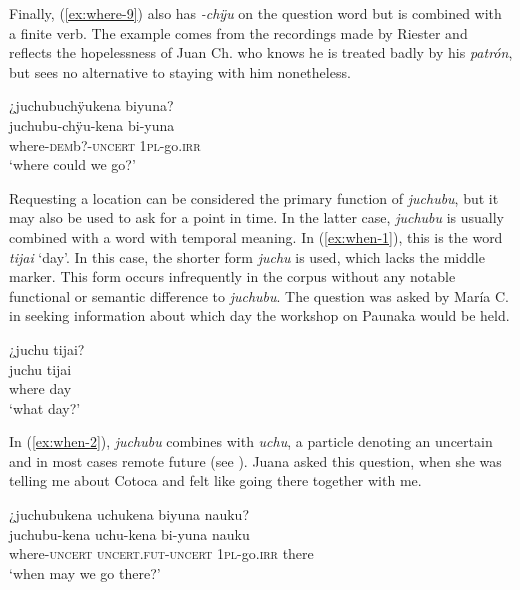 Finally, (\ref{ex:where-9}) also has \textit{-chÿu} on the question word but is combined with a finite verb. The example comes from the recordings made by Riester and reflects the hopelessness of Juan Ch. who knows he is treated badly by his \textit{patrón}, but sees no alternative to staying with him nonetheless.

\ea\label{ex:where-9}
\begingl
\glpreamble ¿juchubuchÿukena biyuna?\\
\gla juchubu-chÿu-kena bi-yuna\\
\glb where-\textsc{dem}b?-\textsc{uncert} 1\textsc{pl}-go.\textsc{irr}\\
\glft ‘where could we go?’
\endgl
\trailingcitation{[nxx-p630101g-1.176]}
\xe

Requesting a location can be considered the primary function of \textit{juchubu}, but it may also be used to ask for a point in time. In the latter case, \textit{juchubu} is usually combined with a word with temporal meaning. In (\ref{ex:when-1}), this is the word \textit{tijai} ‘day’. In this case, the shorter form \textit{juchu} is used, which lacks the middle marker. This form occurs infrequently in the corpus without any notable functional or semantic difference to \textit{juchubu}. The question was asked by María C. in seeking information about which day the workshop on Paunaka would be held.

\ea\label{ex:when-1}
\begingl
\glpreamble ¿juchu tijai?\\
\gla juchu tijai\\
\glb where day\\
\glft ‘what day?’
\endgl
\trailingcitation{[mux-c110810l.015]}
\xe


In (\ref{ex:when-2}), \textit{juchubu} combines with \textit{uchu}, a particle denoting an uncertain and in most cases remote future (see ). Juana asked this question, when she was telling me about Cotoca and felt like going there together with me.

\ea\label{ex:when-2}
\begingl
\glpreamble ¿juchubukena uchukena biyuna nauku?\\
\gla juchubu-kena uchu-kena bi-yuna nauku\\
\glb where-\textsc{uncert} \textsc{uncert.fut}-\textsc{uncert} 1\textsc{pl}-go.\textsc{irr} there\\
\glft ‘when may we go there?’
\endgl
\trailingcitation{[jxx-p120430l-2.557]}
\xe

